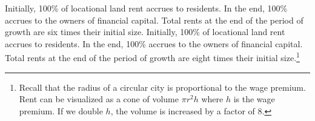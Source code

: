 Initially, 100\% of locational land rent accrues to residents. In the end, 100\% accrues to the owners of financial capital. Total rents at the end of the period of growth are six times their initial size. 
Initially, 100\% of locational land rent accrues to residents. In the end, 100\% accrues to the owners of financial capital. Total rents at the end of the period of growth are eight times their initial size.\footnote{Recall that the radius of a circular city is proportional to the wage premium. Rent can be visualized as a cone of volume $\pi r^2 h$ where $h$ is the wage premium. If we double $h$, the volume is increased by a factor of 8.}

 